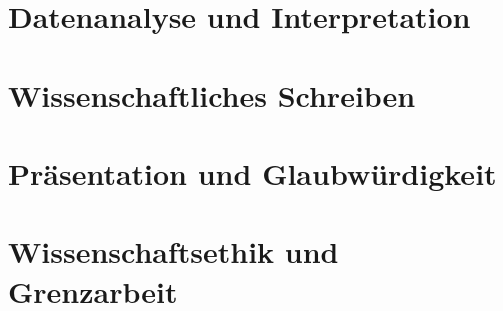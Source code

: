 \chapter{Datenanalyse und Interpretation}


\chapter{Wissenschaftliches Schreiben}


\chapter{Präsentation und Glaubwürdigkeit}


\chapter{Wissenschaftsethik und Grenzarbeit}



